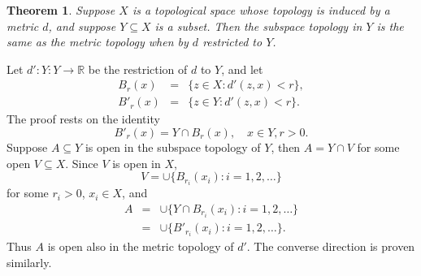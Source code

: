 \documentclass[12pt]{article}
\newcommand{\sR}[0]{\mathbb{R}}
\newtheorem{thm}{Theorem}
\begin{document}
\begin{thm}
Suppose $X$ is a topological space whose topology is induced by a
metric $d$, and suppose $Y\subseteq X$ is a subset. 
Then the subspace topology in $Y$ is the same as the metric topology
when by $d$ restricted to $Y$.
\end{thm}

Let $d'\colon Y\colon Y\to \sR$ be the restriction of $d$ to $Y$,
and let 
\begin{eqnarray*}
   B_r(x) &=& \{ z\in X: d'(z,x)<r \}, \\
   B'_r(x) &=& \{ z\in Y: d'(z,x)<r\}.
\end{eqnarray*}
The proof rests on the  identity
$$
   B'_r(x)=Y\cap B_r(x), \quad x\in Y, r>0.
$$
Suppose $A\subseteq Y$ is open in the subspace topology of $Y$, 
then $A=Y\cap V$ for some open 
  $V\subseteq X$. Since $V$ is open in $X$, 
$$
   V=\cup \{ B_{r_i}(x_i) : i=1,2, \ldots \}
$$
  for some $r_i>0$, $x_i\in X$, and 
\begin{eqnarray*}
  A&=&\cup \{ Y\cap B_{r_i}(x_i) : i=1,2, \ldots \} \\
    &=&\cup \{ B'_{r_i}(x_i) : i=1,2, \ldots \}.
\end{eqnarray*}
Thus $A$ is open also in the metric topology of $d'$.
The converse direction is proven similarly.
\end{document}
